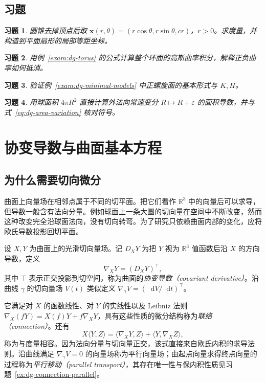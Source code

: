 \documentclass[UTF8,12pt,a4paper,fontset=fandol]{ctexbook}
\newcommand{\R}{\mathbb R}
\newcommand{\dd}{\mathop{}\!\mathrm d}
\newcommand{\ip}[2]{\langle #1,#2\rangle}
\newtheorem{exercise}{习题}[chapter]
\begin{document}
\section{习题}
\begin{exercise}\label{ex:dg-examples-cone}
圆锥去掉顶点后取 $\mathbf x(r,\theta)=(r\cos\theta,r\sin\theta,cr)$，$r>0$。求度量，并构造到平面扇形的局部等距坐标。
\end{exercise}
\begin{exercise}\label{ex:dg-examples-torus}
用例~\ref{exam:dg-torus} 的公式计算整个环面的高斯曲率积分，解释正负曲率如何抵消。
\end{exercise}
\begin{exercise}\label{ex:dg-examples-helicoid}
验证例~\ref{exam:dg-minimal-models} 中正螺旋面的基本形式与 $K,H$。
\end{exercise}
\begin{exercise}\label{ex:dg-examples-sphere-variation}
用球面积 $4\pi R^2$ 直接计算外法向常速变分 $R\mapsto R+\varepsilon$ 的面积导数，并与式~\eqref{eq:dg-area-variation} 核对符号。
\end{exercise}

\chapter{协变导数与曲面基本方程}
\label{chap:dg-connection}

\section{为什么需要切向微分}
曲面上向量场在相邻点属于不同的切平面。把它们看作 $\R^3$ 中的向量后可以求导，但导数一般含有法向分量。例如球面上一条大圆的切向量在空间中不断改变，然而这种改变完全沿球面法向，没有切向转弯。为了研究只依赖曲面内部的变化，应将欧氏导数投影回切平面。

\begin{definition}[协变导数]
设 $X,Y$ 为曲面上的光滑切向量场。记 $D_XY$ 为把 $Y$ 视为 $\R^3$ 值函数后沿 $X$ 的方向导数，定义
\[
 \nabla_XY=(D_XY)^\top,
\]
其中 $\top$ 表示正交投影到切空间，称为曲面的\emph{协变导数（covariant derivative）}。沿曲线 $\gamma$ 的切向量场 $V(t)$ 类似定义 $\nabla_{\dot\gamma}V=(\dd V/\dd t)^\top$。
\end{definition}
它满足对 $X$ 的函数线性、对 $Y$ 的实线性以及 Leibniz 法则 $\nabla_X(fY)=X(f)Y+f\nabla_XY$，具有这些性质的微分结构称为\emph{联络（connection）}。还有
\begin{equation}
 X\ip YZ=\ip{\nabla_XY}Z+\ip Y{\nabla_XZ},
 \label{eq:dg-metric-compatible}
\end{equation}
称为与度量相容。因为法向分量与切向量正交，该式直接来自欧氏内积的求导法则。沿曲线满足 $\nabla_{\dot\gamma}V=0$ 的向量场称为平行向量场；由起点向量求得终点向量的过程称为\emph{平行移动（parallel transport）}，其存在唯一性与保内积性质见习题~\ref{ex:dg-connection-parallel}。
\end{document}
